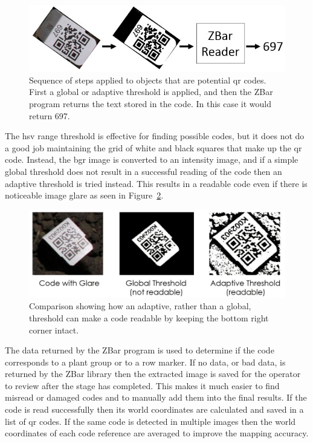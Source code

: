 \begin{figure}
	\centering
    \includegraphics[width=6in]{figures/code_extraction_step2.jpg}
    \caption[Extracted code threshold]{Sequence of steps applied to objects that are potential \ac{qr} codes.  First a global or adaptive threshold is applied, and then the ZBar program returns the text stored in the code. In this case it would return 697.}
    \label{figure:code_extraction2}
\end{figure} 

The \ac{hsv} range threshold is effective for finding possible codes, but it does not do a good job maintaining the grid of white and black squares that make up the \ac{qr} code.  Instead, the \ac{bgr} image is converted to an intensity image, and if a simple global threshold does not result in a successful reading of the code then an adaptive threshold is tried instead.  This results in a readable code even if there is noticeable image glare as seen in Figure~\ref{figure:adaptive_threshold}. 

\begin{figure}
	\centering
    \includegraphics[width=5.5in]{figures/adaptive_threshold.jpg}
    \caption[Adaptive threshold]{Comparison showing how an adaptive, rather than a global, threshold can make a code readable by keeping the bottom right corner intact.}
    \label{figure:adaptive_threshold}
\end{figure} 

The data returned by the ZBar program is used to determine if the code corresponds to a plant group or to a row marker.  If no data, or bad data, is returned by the ZBar library then the extracted image is saved for the operator to review after the stage has completed.  This makes it much easier to find misread or damaged codes and to manually add them into the final results.  If the code is read successfully then its world coordinates are calculated and saved in a list of \ac{qr} codes.   If the same code is detected in multiple images then the world coordinates of each code reference are averaged to improve the mapping accuracy.

